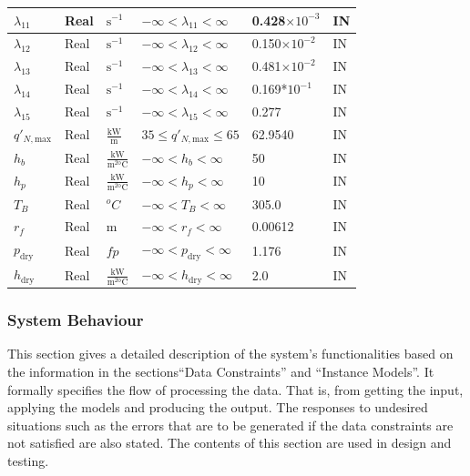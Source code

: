 \begin{longtable}{| p{\colCwidth} | p{\colCwidth} | p{\colDwidth}| p{\colAwidth}|
    p{\colFwidth}|p{\colCwidth}|}
\hline
$\lambda_{11}$&Real&$\text{s}^{-1}$&$-\infty <\lambda_{11} <\infty$&0.428$\times 10^{-3}$&IN\\
\hline
$\lambda_{12}$&Real&$\text{s}^{-1}$&$-\infty <\lambda_{12} <\infty$&0.150$\times 10^{-2}$&IN\\
\hline
$\lambda_{13}$&Real&$\text{s}^{-1}$&$-\infty <\lambda_{13} <\infty$&0.481$\times 10^{-2}$&IN\\
\hline
$\lambda_{14}$&Real&$\text{s}^{-1}$&$-\infty <\lambda_{14}<\infty$&0.169*$10^{-1}$&IN\\
\hline
$\lambda_{15}$&Real&$\text{s}^{-1}$&$-\infty <\lambda_{15} <\infty$&0.277&IN\\
\hline
$q'_{N,\text{max}}$&Real&$\frac{\text{kW}}{\text{m}}$&$35\leq q'_{N,\text{max}} \leq 65$&62.9540&IN\\
\hline
$h_b$&Real&$\mathrm{\frac{kW}{m^{2o}C}}$&$-\infty <h_b<\infty$&50&IN\\
\hline
$h_p$&Real&$\mathrm{\frac{kW}{m^{2o}C}}$&$-\infty <h_p<\infty$&10&IN\\
\hline
$T_B$&Real&$^oC$&$-\infty <T_B<\infty$&305.0&IN\\
\hline
$r_f$&Real&$\text{m}$&$-\infty <r_f<\infty$&0.00612&IN\\
\hline
$p_{\text{dry}}$&Real&$fp$&$-\infty <p_{\text{dry}}<\infty$&1.176&IN\\
\hline
$h_{\text{dry}}$&Real&$\mathrm{\frac{kW}{m^{2o}C}}$&$-\infty<h_{\text{dry}}<\infty$&2.0&IN\\
\hline
\end{longtable}

\subsubsection{System Behaviour}    

This section gives a detailed description of the  system's functionalities based
on the information  in the sections``Data Constraints'' and ``Instance
Models''. It formally specifies the flow of  processing the data. That is, from
getting the input, applying the models and producing the output. The responses
to undesired situations such as the errors that are to be generated if the data
constraints are not satisfied are also stated. The contents of this section are
used in design and testing.

~\newline

